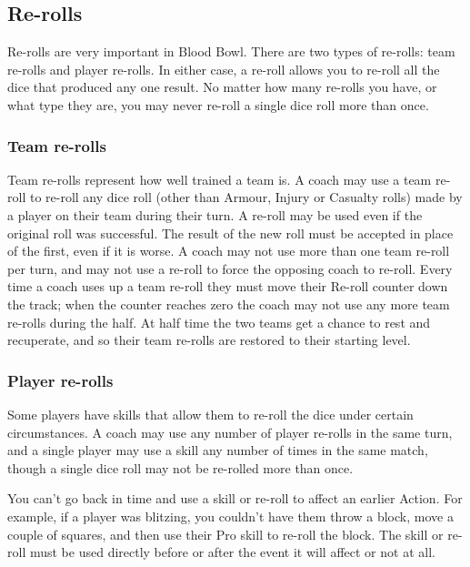 \begin{multicols}{2}
\subsection{Re-rolls}
\par Re-rolls are very important in Blood Bowl. There are two types of re-rolls: team re-rolls and player re-rolls. In either case, a re-roll allows you to re-roll all the dice that produced any one result. No matter how many re-rolls you have, or what type they are, you may never re-roll a single dice roll more than once.

\subsubsection{Team re-rolls}
\par Team re-rolls represent how well trained a team is. A coach may use a team re-roll to re-roll any dice roll (other than Armour, Injury or Casualty rolls) made by a player on their team during their turn. A re-roll may be used even if the original roll was successful. The result of the new roll must be accepted in place of the first, even if it is worse. A coach may not use more than one team re-roll per turn, and may not use a re-roll to force the opposing coach to re-roll. Every time a coach uses up a team re-roll they must move their Re-roll counter down the track; when the counter reaches zero the coach may not use any more team re-rolls during the half. At half time the two teams get a chance to rest and recuperate, and so their team re-rolls are restored to their starting level.

\subsubsection{Player re-rolls}
\par Some players have skills that allow them to re-roll the dice under certain circumstances. A coach may use any number of player re-rolls in the same turn, and a single player may use a skill any number of times in the same match, though a single dice roll may not be re-rolled more than once.
\par You can't go back in time and use a skill or re-roll to affect an earlier Action. For example, if a player was blitzing, you couldn't have them throw a block, move a couple of squares, and then use their Pro skill to re-roll the block. The skill or re-roll must be used directly before or after the event it will affect or not at all.


\end{multicols}
